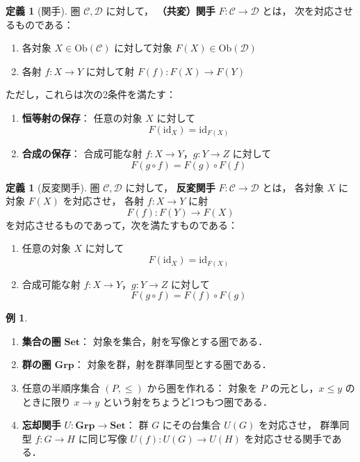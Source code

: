 \documentclass[dvipdfmx,a4paper,12pt]{jsarticle}
\theoremstyle{definition}
\newtheorem{definition}[theorem]{定義}
\newtheorem{example}[theorem]{例}
\begin{document}
\begin{definition}[関手]
    圏 $\mathcal{C},\mathcal{D}$ に対して，
    \textbf{（共変）関手} $F\colon \mathcal{C}\to\mathcal{D}$ とは，
    次を対応させるものである：
    \begin{enumerate}
        \item 各対象 $X\in\mathrm{Ob}(\mathcal{C})$ に対して対象
        $F(X)\in\mathrm{Ob}(\mathcal{D})$
        \item 各射 $f\colon X\to Y$ に対して射
        $F(f)\colon F(X)\to F(Y)$
    \end{enumerate}
    ただし，これらは次の2条件を満たす：
    \begin{enumerate}
        \item \textbf{恒等射の保存}：
        任意の対象 $X$ に対して
        \[
            F(\mathrm{id}_X)=\mathrm{id}_{F(X)}
        \]
        \item \textbf{合成の保存}：
        合成可能な射 $f\colon X\to Y$，$g\colon Y\to Z$ に対して
        \[
            F(g\circ f)=F(g)\circ F(f)
        \]
    \end{enumerate}
\end{definition}

\begin{definition}[反変関手]
    圏 $\mathcal{C},\mathcal{D}$ に対して，
    \textbf{反変関手} $F\colon \mathcal{C}\to\mathcal{D}$ とは，
    各対象 $X$ に対象 $F(X)$ を対応させ，
    各射 $f\colon X\to Y$ に射
    \[
        F(f)\colon F(Y)\to F(X)
    \]
    を対応させるものであって，次を満たすものである：
    \begin{enumerate}
        \item 任意の対象 $X$ に対して
        \[
            F(\mathrm{id}_X)=\mathrm{id}_{F(X)}
        \]
        \item 合成可能な射 $f\colon X\to Y$，$g\colon Y\to Z$ に対して
        \[
            F(g\circ f)=F(f)\circ F(g)
        \]
    \end{enumerate}
\end{definition}

\begin{example}
    \begin{enumerate}
        \item \textbf{集合の圏} $\mathbf{Set}$：
        対象を集合，射を写像とする圏である．
        \item \textbf{群の圏} $\mathbf{Grp}$：
        対象を群，射を群準同型とする圏である．
        \item 任意の半順序集合 $(P,\leq)$ から圏を作れる：
        対象を $P$ の元とし，$x\leq y$ のときに限り
        $x\to y$ という射をちょうど1つもつ圏である．
        \item \textbf{忘却関手} $U\colon \mathbf{Grp}\to\mathbf{Set}$：
        群 $G$ にその台集合 $U(G)$ を対応させ，
        群準同型 $f\colon G\to H$ に同じ写像
        $U(f)\colon U(G)\to U(H)$ を対応させる関手である．
    \end{enumerate}
\end{example}
\end{document}
